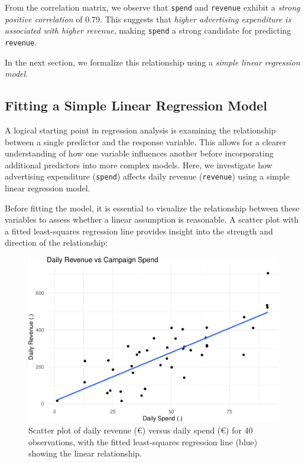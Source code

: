 \documentclass[
]{book}
\newcommand{\passthrough}[1]{#1}
\theoremstyle{definition}
\theoremstyle{definition}
\theoremstyle{definition}
\theoremstyle{definition}
\theoremstyle{remark}
\begin{document}
From the correlation matrix, we observe that \passthrough{\lstinline!spend!} and \passthrough{\lstinline!revenue!} exhibit a \emph{strong positive correlation} of 0.79. This suggests that \emph{higher advertising expenditure is associated with higher revenue}, making \passthrough{\lstinline!spend!} a strong candidate for predicting \passthrough{\lstinline!revenue!}.

In the next section, we formalize this relationship using a \emph{simple linear regression model}.

\subsection*{Fitting a Simple Linear Regression Model}\label{fitting-a-simple-linear-regression-model}

A logical starting point in regression analysis is examining the relationship between a single predictor and the response variable. This allows for a clearer understanding of how one variable influences another before incorporating additional predictors into more complex models. Here, we investigate how advertising expenditure (\passthrough{\lstinline!spend!}) affects daily revenue (\passthrough{\lstinline!revenue!}) using a simple linear regression model.

Before fitting the model, it is essential to visualize the relationship between these variables to assess whether a linear assumption is reasonable. A scatter plot with a fitted least-squares regression line provides insight into the strength and direction of the relationship:

\begin{figure}

{\centering \includegraphics[width=0.8\linewidth]{regression_files/figure-latex/scoter-plot-simple-reg-1} 

}

\caption{Scatter plot of daily revenue (€) versus daily spend (€) for 40 observations, with the fitted least-squares regression line (blue) showing the linear relationship.}\label{fig:scoter-plot-simple-reg}
\end{figure}
\end{document}
